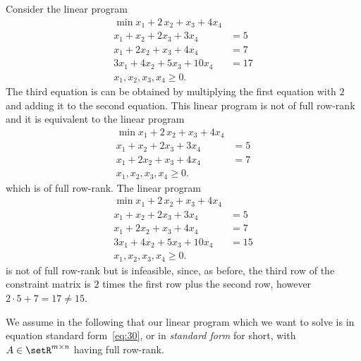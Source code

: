 \begin{example}
  \label{sec:full-row-rank}
  Consider the linear program 
  \begin{equation}
    \label{eq:46}
    \begin{array}{rl}
      \min  x_1 + 2 \,x_2 + x_3 + 4 x_4 \\
      x_1 + x_2 + 2 x_3 + 3 x_4 & = 5 \\
      x_1 + 2 x_2 + x_3 + 4 x_4 & =7 \\
      3x_1 +4x_2 + 5 x_3 + 10 x_4& = 17\\
      x_1,x_2,x_3,x_4 \geq0. 
    \end{array}
  \end{equation}
  The third equation is can be obtained by multiplying the first
  equation with $2$ and adding it to the second equation. This linear
  program is not of full row-rank and it is equivalent to the linear
  program 
  \begin{equation}
    \label{eq:47}
    \begin{array}{rl}
      \min  x_1 + 2 \,x_2 + x_3 + 4 x_4 \\
      x_1 + x_2 + 2 x_3 + 3 x_4 & = 5 \\
      x_1 + 2 x_2 + x_3 + 4 x_4 & =7 \\
      x_1,x_2,x_3,x_4 \geq0. 
    \end{array}
  \end{equation}
  which is of full row-rank. The linear program 
 \begin{displaymath}
    \begin{array}{rl}
      \min  x_1 + 2 \,x_2 + x_3 + 4 x_4 \\
      x_1 + x_2 + 2 x_3 + 3 x_4 & = 5 \\
      x_1 + 2 x_2 + x_3 + 4 x_4 & =7 \\
      3x_1 +4x_2 + 5 x_3 + 10 x_4& = 15\\
      x_1,x_2,x_3,x_4 \geq0. 
    \end{array}
  \end{displaymath}
  is not of full row-rank but is infeasible, since, as before, the
  third row of the constraint matrix is $2$ times the first row plus
  the second row, however $2\cdot 5 + 7 =17 \neq 15$. 
\end{example}



\begin{assumption} 
\label{assumption1}
We assume in the following that our linear program which
we want to solve is in equation standard form~\eqref{eq:30}, or in
\emph{standard   form} for short, with $A\in \setR^{m\times n}$ having full
row-rank. 
\end{assumption}



